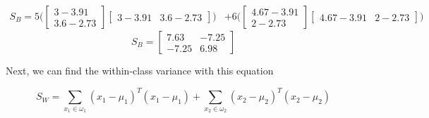 \documentclass[12pt]{article}
\begin{document}
\begin{align}
    S_B = 5\Big( 
    \begin{bmatrix}
        3 - 3.91 \\
        3.6 - 2.73
    \end{bmatrix} 
    \begin{bmatrix}
        3 - 3.91 & 3.6 - 2.73
    \end{bmatrix}
    \Big)
    &+
    6 \Big( \begin
    {bmatrix}
        4.67 - 3.91 \\
        2 - 2.73
    \end{bmatrix} 
    \begin{bmatrix}
        4.67 - 3.91 & 2 - 2.73
    \end{bmatrix}
    \Big)
\end{align}
\begin{equation}
    \boxed{
    S_B =
    \begin{bmatrix}
        7.63 & -7.25 \\
        -7.25 & 6.98
    \end{bmatrix}
    }
\end{equation}

Next, we can find the within-class variance with this equation 

\begin{equation}
    S_W = \sum_{x_1 \in \omega_1} (x_1 - \mu_1)^T (x_1 - \mu_1) + \sum_{x_2 \in \omega_2} (x_2 - \mu_2)^T (x_2 - \mu_2)
\end{equation}
\end{document}
